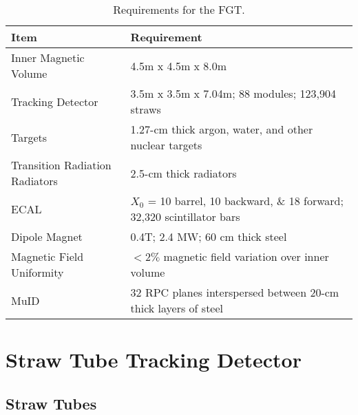 \documentclass[aps,prl,preprint,groupedaddress]{revtex4}
\begin{document}
\begin{table}
\centering
  \caption{\label{tab:STT_specs} Requirements for the FGT.}
  \begin{tabular}{| l | l |}
    \hline
Item&Requirement \\
    \hline
Inner Magnetic Volume & 4.5m x 4.5m x 8.0m  \\
Tracking Detector & 3.5m x 3.5m x 7.04m; 88 modules; 123,904 straws \\
Targets & 1.27-cm thick argon, water, and other nuclear targets \\
Transition Radiation Radiators & 2.5-cm thick radiators \\
ECAL & $X_0$ = 10 barrel, 10 backward, \& 18 forward; 32,320 scintillator bars \\
Dipole Magnet & 0.4T; 2.4 MW; 60 cm thick steel \\
Magnetic Field Uniformity & $<2\%$ magnetic field variation over inner volume \\ 
MuID & 32 RPC planes interspersed between 20-cm thick layers of steel \\ 
     \hline
  \end{tabular}
\end{table}

\section{Straw Tube Tracking Detector}

\subsection{Straw Tubes}
\end{document}
